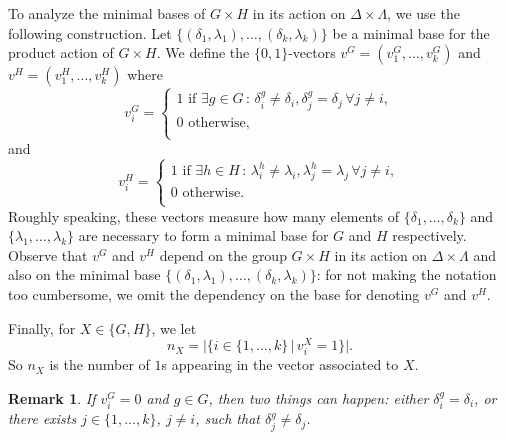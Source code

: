 \documentclass{amsart}
\newtheorem{remark}[theorem]{Remark}
\begin{document}
	
	To analyze the minimal bases of $G \times H$ in its action on $\Delta\times \Lambda$, we use the following construction.
	Let $\{(\delta_1,\lambda_1), \dots , (\delta_k, \lambda_k)\}$ be a minimal base for the product action of $G \times H$. We define the $\{0,1\}$-vectors $v^G = (v^G_1,\dots, v^G_k)$ and $v^H = (v^H_1,\dots,v^H_k)$ where
	\[
	 v^G_i =
		\begin{cases}
			1  \text{ if } \exists g \in G \, : \, \delta_i^g \neq \delta_i, \delta_j^g = \delta_j \, \forall j \neq i ,\\
			0 \text{ otherwise,}\\
		\end{cases}
	\]
	and
	\[
	v^H_i =
	\begin{cases}
		1  \text{ if } \exists h \in H \, : \, \lambda_i^h \neq \lambda_i, \lambda_j^h = \lambda_j \, \forall j \neq i ,\\
		0 \text{ otherwise.}\\
	\end{cases}
	\]
	Roughly speaking, these vectors measure how many elements of $\{\delta_1,\dots,\delta_k\}$ and $\{\lambda_1,\dots,\lambda_k\}$ are necessary to form a minimal base for $G$ and $H$ respectively. Observe that $v^G$ and $v^H$ depend on the group $G\times H$ in its action on $\Delta\times\Lambda$ and also on the minimal base $\{(\delta_1,\lambda_1), \dots , (\delta_k, \lambda_k)\}$: for not making the notation too cumbersome, we omit the dependency on the base for denoting $v^G$ and $v^H$.

	Finally, for $X \in \{G,H\}$, we let
	\[
		n_X = |\{i \in \{1,\dots,k\} \, | \, v^X_i = 1 \}|.
	\]
	So $n_X$ is the number of $1$s appearing in the vector associated to $X$.
	\begin{remark}{\rm If $v_i^G = 0$ and $g \in G$, then two things can happen: either $\delta_i^g = \delta_i$, or there exists $j \in \{1,\dots,k\}$, $j \neq i$, such that $\delta_j^g \neq \delta_j$.}
	\end{remark}
	
\end{document}
